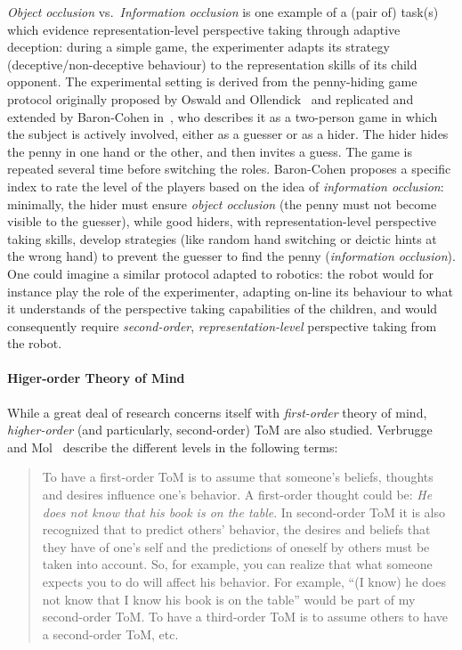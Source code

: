 \documentclass{sig-alternate}
\begin{document}
\emph{Object occlusion} vs.~\emph{Information occlusion} is one example of a
(pair of) task(s) which evidence representation-level perspective taking through
adaptive deception: during a simple game, the experimenter adapts its strategy
(deceptive/non-deceptive behaviour) to the representation skills of its child
opponent. The experimental setting is derived from the penny-hiding game
protocol originally proposed by Oswald and Ollendick~\cite{oswald1989role} and
replicated and extended by Baron-Cohen in~\cite{baron1992out}, who describes it
as a two-person game in which the subject is actively involved, either as a
guesser or as a hider. The hider hides the penny in one hand or the other, and
then invites a guess. The game is repeated several time before switching the
roles. Baron-Cohen proposes a specific index to rate the level of the players
based on the idea of \emph{information occlusion}: minimally, the hider must
ensure \emph{object occlusion} (the penny must not become visible to the
guesser), while good hiders, with representation-level perspective taking
skills, develop strategies (like random hand switching or deictic hints at the
wrong hand) to prevent the guesser to find the penny (\emph{information
occlusion}). One could imagine a similar protocol adapted to robotics: the robot
would for instance play the role of the experimenter, adapting on-line its
behaviour to what it understands of the perspective taking capabilities of the
children, and would consequently require \emph{second-order},
\emph{representation-level} perspective taking from the robot.



\paragraph{Higer-order Theory of Mind}

While a great deal of research concerns itself with \emph{first-order} theory of
mind, \emph{higher-order} (and particularly, second-order) ToM are also studied.
Verbrugge and Mol~\cite{verbrugge2008learning} describe the different levels in
the following terms:
\begin{quote}
To have a first-order ToM is to assume that someone's beliefs, thoughts and
desires influence one's behavior. A first-order thought could be: \emph{He does not
know that his book is on the table}. In second-order ToM it is also recognized
that to predict others' behavior, the desires and beliefs that they have of
one's self and the predictions of oneself by others must be taken into account.
So, for example, you can realize that what someone expects you to do will affect
his behavior. For example, ``(I know) he does not know that I know his book is on
the table'' would be part of my second-order ToM. To have a third-order ToM is to
assume others to have a second-order ToM, etc.
\end{quote}
\end{document}
